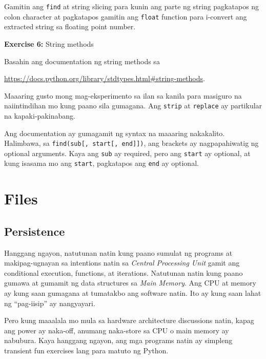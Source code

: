 \documentclass[10pt,]{book}
\begin{document}
Gamitin ang \texttt{find} at string slicing para kunin ang parte ng
string pagkatapos ng colon character at pagkatapos gamitin ang
\texttt{float} function para i-convert ang extracted string sa floating
point number.

 

\textbf{Exercise 6:} String methods

Basahin ang documentation ng string methods sa

\url{https://docs.python.org/library/stdtypes.html\#string-methods}.

Maaaring gusto mong mag-eksperimento sa ilan sa kanila para masiguro na
naiintindihan mo kung paano sila gumagana. Ang \texttt{strip} at
\texttt{replace} ay partikular na kapaki-pakinabang.

Ang documentation ay gumagamit ng syntax na maaaring nakakalito.
Halimbawa, sa \texttt{find(sub{[},\ start{[},\ end{]}{]})}, ang brackets
ay nagpapahiwatig ng optional arguments. Kaya ang \texttt{sub} ay
required, pero ang \texttt{start} ay optional, at kung isasama mo ang
\texttt{start}, pagkatapos ang \texttt{end} ay optional.

\chapter{Files}\label{files}

 

\section{Persistence}\label{persistence}

 

Hanggang ngayon, natutunan natin kung paano sumulat ng programs at
makipag-ugnayan sa intentions natin sa \emph{Central Processing Unit}
gamit ang conditional execution, functions, at iterations. Natutunan
natin kung paano gumawa at gumamit ng data structures sa \emph{Main
Memory}. Ang CPU at memory ay kung saan gumagana at tumatakbo ang
software natin. Ito ay kung saan lahat ng ``pag-iisip'' ay nangyayari.

Pero kung maaalala mo mula sa hardware architecture discussions natin,
kapag ang power ay naka-off, anumang naka-store sa CPU o main memory ay
nabubura. Kaya hanggang ngayon, ang mga programs natin ay simpleng
transient fun exercises lang para matuto ng Python.
\end{document}
